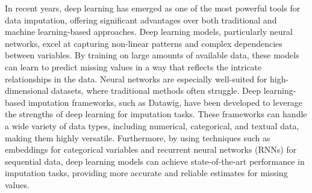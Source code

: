 \documentclass{article}
\begin{document}
In recent years, deep learning has emerged as one of the most powerful tools for data imputation, offering significant advantages over both traditional and machine learning-based approaches. Deep learning models, particularly neural networks, excel at capturing non-linear patterns and complex dependencies between variables. By training on large amounts of available data, these models can learn to predict missing values in a way that reflects the intricate relationships in the data. Neural networks are especially well-suited for high-dimensional datasets, where traditional methods often struggle. Deep learning-based imputation frameworks, such as Datawig, have been developed to leverage the strengths of deep learning for imputation tasks. These frameworks can handle a wide variety of data types, including numerical, categorical, and textual data, making them highly versatile. Furthermore, by using techniques such as embeddings for categorical variables and recurrent neural networks (RNNs) for sequential data, deep learning models can achieve state-of-the-art performance in imputation tasks, providing more accurate and reliable estimates for missing values.
\end{document}
